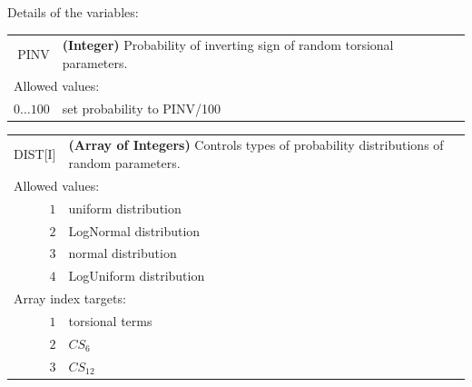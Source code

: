 \documentclass[10pt,a4paper,openany]{memoir}
\numberwithin{equation}{section}
\begin{document}
\noindent Details of the variables:
\vspace{2ex}

{
\begin{tabular}{r@{ : }l}
\label{descr:pinv}
      PINV&\textbf{(Integer)} Probability of inverting sign of random torsional parameters.                             \\ 
\multicolumn{2}{l}{Allowed values:} \\ 
    \(0 \ldots 100 \)&set probability to PINV/100                                                                          \\ 
\end{tabular}
\vspace{1ex}
}

{
\begin{tabular}{r@{ : }l}
\label{descr:dist}
      DIST[I]&\textbf{(Array of Integers)} Controls types of probability distributions of random parameters.                                      \\ 
\multicolumn{2}{l}{Allowed values:} \\ 
     \(1\)&uniform distribution                                                                                 \\ 
\(2\)&LogNormal distribution                                                                                  \\ 
\(3\)&normal distribution                                                                              \\ 
\(4\)&LogUniform distribution                                                                              \\ 
\multicolumn{2}{l}{Array index targets:} \\ 
     \(1\)&torsional terms                                                                                      \\ 
     \(2\)&$CS_6$                                                                                               \\ 
     \(3\)&$CS_{12}$                                                                                            \\ 
\end{tabular}
\vspace{1ex}
}
\end{document}
